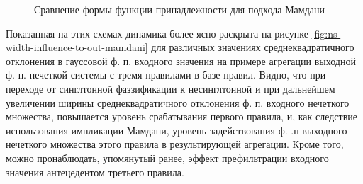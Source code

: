 \begin{figure}[ht]
\begin{subfigure}[b]{\textwidth}
    \end{subfigure}
    \caption{Сравнение формы функции принадлежности для подхода Мамдани}
\end{figure}

Показанная на этих схемах динамика более ясно раскрыта на рисунке \cref{fig:ns-width-influence-to-out-mamdani} для различных значениях среднеквадратичного отклонения в гауссовой ф. п. входного значения на примере агрегации выходной ф. п. нечеткой системы с тремя правилами в базе правил. Видно, что при переходе от синглтонной фаззификации к несинглтонной и при дальнейшем увеличении ширины среднеквадратичного отклонения ф. п. входного нечеткого множества, повышается уровень срабатывания первого правила, и, как следствие использования импликации Мамдани, уровень задействования ф. .п выходного нечеткого множества этого правила в результирующей агрегации. Кроме того, можно пронаблюдать, упомянутый ранее, эффект префильтрации входного значения антецедентом третьего правила.



